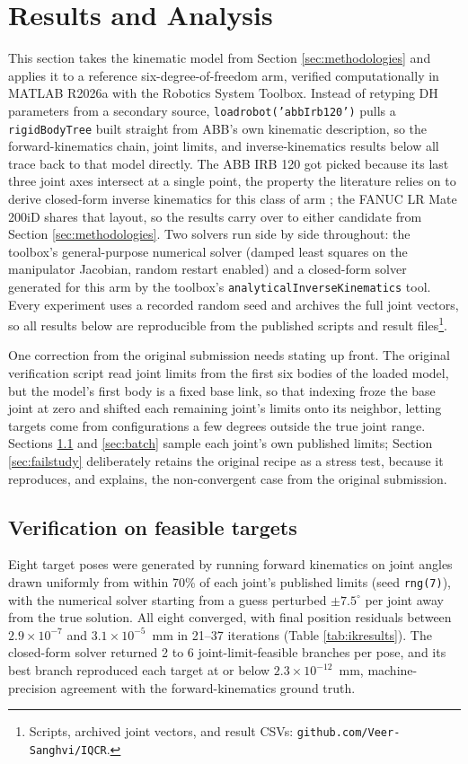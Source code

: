 \documentclass[conference]{IEEEtran}
\begin{document}
\section{Results and Analysis}
\label{sec:results}
This section takes the kinematic model from Section \ref{sec:methodologies} and applies it to a reference six-degree-of-freedom arm, verified computationally in MATLAB R2026a with the Robotics System Toolbox. Instead of retyping DH parameters from a secondary source, \texttt{loadrobot('abbIrb120')} pulls a \texttt{rigidBodyTree} built straight from ABB's own kinematic description, so the forward-kinematics chain, joint limits, and inverse-kinematics results below all trace back to that model directly. The ABB IRB 120 got picked because its last three joint axes intersect at a single point, the property the literature relies on to derive closed-form inverse kinematics for this class of arm \cite{ref21}; the FANUC LR Mate 200iD shares that layout, so the results carry over to either candidate from Section \ref{sec:methodologies}. Two solvers run side by side throughout: the toolbox's general-purpose numerical solver (damped least squares on the manipulator Jacobian, random restart enabled) and a closed-form solver generated for this arm by the toolbox's \texttt{analyticalInverseKinematics} tool. Every experiment uses a recorded random seed and archives the full joint vectors, so all results below are reproducible from the published scripts and result files\footnote{Scripts, archived joint vectors, and result CSVs: \texttt{github.com/Veer-Sanghvi/IQCR}.}.

One correction from the original submission needs stating up front. The original verification script read joint limits from the first six bodies of the loaded model, but the model's first body is a fixed base link, so that indexing froze the base joint at zero and shifted each remaining joint's limits onto its neighbor, letting targets come from configurations a few degrees outside the true joint range. Sections \ref{sec:feasible} and \ref{sec:batch} sample each joint's own published limits; Section \ref{sec:failstudy} deliberately retains the original recipe as a stress test, because it reproduces, and explains, the non-convergent case from the original submission.

\subsection{Verification on feasible targets}
\label{sec:feasible}
Eight target poses were generated by running forward kinematics on joint angles drawn uniformly from within 70\% of each joint's published limits (seed \texttt{rng(7)}), with the numerical solver starting from a guess perturbed $\pm 7.5^\circ$ per joint away from the true solution. All eight converged, with final position residuals between $2.9\times10^{-7}$ and $3.1\times10^{-5}$~mm in 21--37 iterations (Table \ref{tab:ikresults}). The closed-form solver returned 2 to 6 joint-limit-feasible branches per pose, and its best branch reproduced each target at or below $2.3\times10^{-12}$~mm, machine-precision agreement with the forward-kinematics ground truth.
\end{document}
